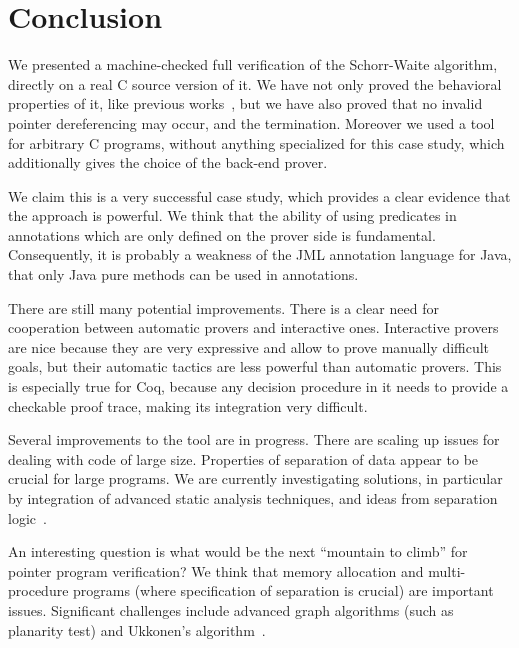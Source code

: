 \section{Conclusion}
\label{sec:conclusion}

We presented a machine-checked full verification of the Schorr-Waite
algorithm, directly on a real C source version of it. We have not only
proved the behavioral properties of it, like previous
works~\cite{bornat00mpc,mehta03cade}, but we have also proved that no
invalid pointer dereferencing may occur, and the
termination. Moreover we used a tool for arbitrary C programs, without
anything specialized for this case study, which additionally gives the
choice of the back-end prover.

We claim this is a very successful case study, which provides a clear
evidence that the \caduceus{} approach is powerful. We think that the
ability of using predicates in annotations which are only defined on
the prover side is fundamental. Consequently, it is probably a
weakness of the JML annotation language for Java, that only Java
pure methods can be used in annotations.

There are still many potential improvements. There is a clear
need for cooperation between automatic provers and interactive ones.
Interactive provers are nice because they are very expressive and
allow to prove manually difficult goals, but their automatic tactics
are less powerful than automatic provers. This is especially true for
Coq, because any decision procedure in it needs to provide a checkable
proof trace, making its integration very difficult.

Several improvements to the \caduceus{} tool are in progress. There are
scaling up issues for dealing with code of large size. Properties of
separation of data appear to be crucial for large programs. We are
currently investigating solutions, in particular by integration of
advanced static analysis techniques, and ideas from separation
logic~\cite{reynolds02lics}.

An interesting question is what would be the next ``mountain to
climb'' for pointer program verification? We think that
memory allocation and multi-procedure programs (where specification of
separation is crucial) are important issues. Significant challenges
include advanced graph algorithms (such as planarity test) and
Ukkonen's algorithm~\cite{ukkonen95}.


